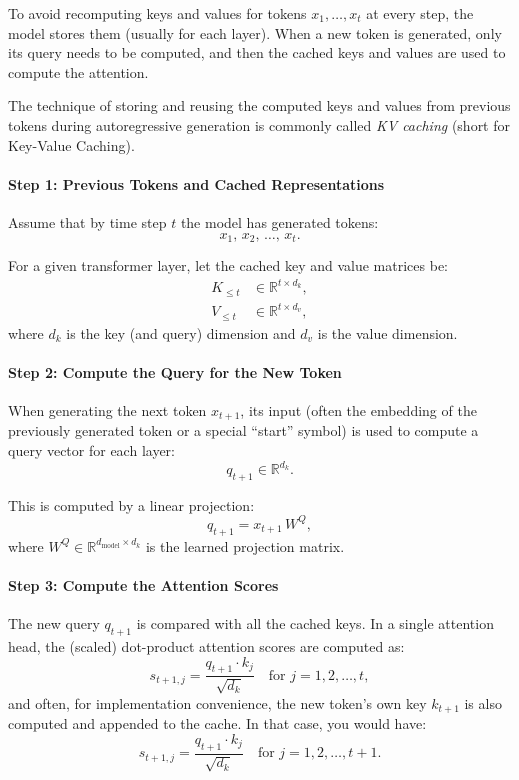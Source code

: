 To avoid recomputing keys and values for tokens \( x_1, \dots, x_t \) at every step, the model stores them (usually for each layer). When a new token is generated, only its query needs to be computed, and then the cached keys and values are used to compute the attention.

The technique of storing and reusing the computed keys and values from previous tokens during autoregressive generation is commonly called \textit{KV caching} (short for Key-Value Caching).

\paragraph{Step 1: Previous Tokens and Cached Representations}

Assume that by time step \( t \) the model has generated tokens:
\[
x_1,\, x_2,\, \dots,\, x_t.
\]

For a given transformer layer, let the cached key and value matrices be:
\[
\begin{aligned}
K_{\leq t} &\in \mathbb{R}^{t \times d_k}, \\
V_{\leq t} &\in \mathbb{R}^{t \times d_v},
\end{aligned}
\]
where \( d_k \) is the key (and query) dimension and \( d_v \) is the value dimension.

\paragraph{Step 2: Compute the Query for the New Token}

When generating the next token \( x_{t+1} \), its input (often the embedding of the previously generated token or a special “start” symbol) is used to compute a query vector for each layer:
\[
q_{t+1} \in \mathbb{R}^{d_k}.
\]

This is computed by a linear projection:
\[
q_{t+1} = x_{t+1} \, W^Q,
\]
where \( W^Q \in \mathbb{R}^{d_{\text{model}} \times d_k} \) is the learned projection matrix.

\paragraph{Step 3: Compute the Attention Scores}

The new query \( q_{t+1} \) is compared with all the cached keys. In a single attention head, the (scaled) dot-product attention scores are computed as:
\[
s_{t+1,j} = \frac{q_{t+1} \cdot k_j}{\sqrt{d_k}} \quad \text{for } j=1,2,\dots,t,
\]
and often, for implementation convenience, the new token's own key \( k_{t+1} \) is also computed and appended to the cache. In that case, you would have:
\[
s_{t+1,j} = \frac{q_{t+1} \cdot k_j}{\sqrt{d_k}} \quad \text{for } j=1,2,\dots,t+1.
\]

